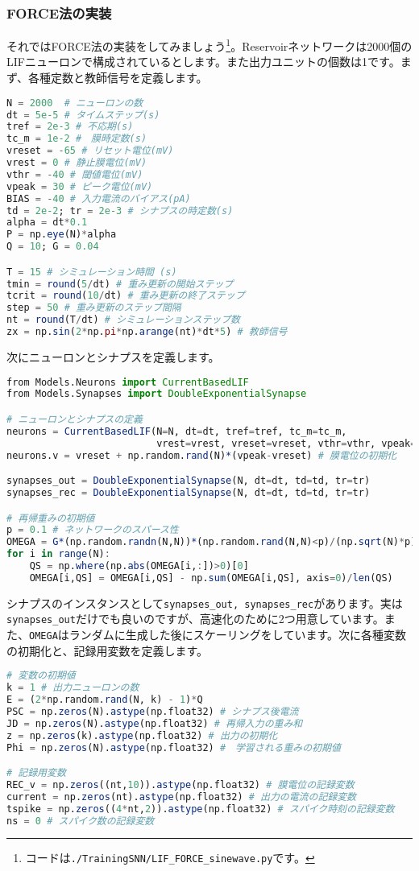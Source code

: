 \subsubsection{FORCE法の実装}
それではFORCE法の実装をしてみましょう\footnote{コードは\texttt{./TrainingSNN/LIF\_FORCE\_sinewave.py}です。}。Reservoirネットワークは2000個のLIFニューロンで構成されているとします。また出力ユニットの個数は1です。まず、各種定数と教師信号を定義します。
\begin{lstlisting}[language=julia]
N = 2000  # ニューロンの数
dt = 5e-5 # タイムステップ(s)
tref = 2e-3 # 不応期(s)
tc_m = 1e-2 #　膜時定数(s)
vreset = -65 # リセット電位(mV) 
vrest = 0 # 静止膜電位(mV)
vthr = -40 # 閾値電位(mV)
vpeak = 30 # ピーク電位(mV)
BIAS = -40 # 入力電流のバイアス(pA)
td = 2e-2; tr = 2e-3 # シナプスの時定数(s)
alpha = dt*0.1  
P = np.eye(N)*alpha
Q = 10; G = 0.04

T = 15 # シミュレーション時間 (s)
tmin = round(5/dt) # 重み更新の開始ステップ
tcrit = round(10/dt) # 重み更新の終了ステップ
step = 50 # 重み更新のステップ間隔
nt = round(T/dt) # シミュレーションステップ数
zx = np.sin(2*np.pi*np.arange(nt)*dt*5) # 教師信号
\end{lstlisting}
次にニューロンとシナプスを定義します。
\begin{lstlisting}[language=julia]
from Models.Neurons import CurrentBasedLIF
from Models.Synapses import DoubleExponentialSynapse

# ニューロンとシナプスの定義 
neurons = CurrentBasedLIF(N=N, dt=dt, tref=tref, tc_m=tc_m,
                          vrest=vrest, vreset=vreset, vthr=vthr, vpeak=vpeak)
neurons.v = vreset + np.random.rand(N)*(vpeak-vreset) # 膜電位の初期化

synapses_out = DoubleExponentialSynapse(N, dt=dt, td=td, tr=tr)
synapses_rec = DoubleExponentialSynapse(N, dt=dt, td=td, tr=tr)

# 再帰重みの初期値
p = 0.1 # ネットワークのスパース性
OMEGA = G*(np.random.randn(N,N))*(np.random.rand(N,N)<p)/(np.sqrt(N)*p)
for i in range(N):
    QS = np.where(np.abs(OMEGA[i,:])>0)[0]
    OMEGA[i,QS] = OMEGA[i,QS] - np.sum(OMEGA[i,QS], axis=0)/len(QS)
\end{lstlisting}
シナプスのインスタンスとして\texttt{synapses\_out, synapses\_rec}があります。実は\texttt{synapses\_out}だけでも良いのですが、高速化のために2つ用意しています。また、\texttt{OMEGA}はランダムに生成した後にスケーリングをしています。次に各種変数の初期化と、記録用変数を定義します。
\begin{lstlisting}[language=julia]
# 変数の初期値
k = 1 # 出力ニューロンの数
E = (2*np.random.rand(N, k) - 1)*Q
PSC = np.zeros(N).astype(np.float32) # シナプス後電流
JD = np.zeros(N).astype(np.float32) # 再帰入力の重み和
z = np.zeros(k).astype(np.float32) # 出力の初期化
Phi = np.zeros(N).astype(np.float32) #　学習される重みの初期値

# 記録用変数 
REC_v = np.zeros((nt,10)).astype(np.float32) # 膜電位の記録変数
current = np.zeros(nt).astype(np.float32) # 出力の電流の記録変数
tspike = np.zeros((4*nt,2)).astype(np.float32) # スパイク時刻の記録変数
ns = 0 # スパイク数の記録変数 
\end{lstlisting}
